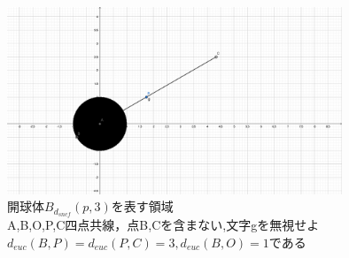 \documentclass{jreport}
\newcommand{\de}{d_{euc}}
\newcommand{\ds}{d_{sncf}}
\newcommand{\bs}{B_{\ds}}
\begin{document}
\begin{figure}[H]
\centering
\includegraphics[width=10cm]{4.pdf}
\caption{開球体$\bs(p,3)$を表す領域\\
	{\footnotesize A,B,O,P,C四点共線，点B,Cを含まない,文字gを無視せよ$\de(B,P)=\de(P,C)=3,\de(B,O)=1$である}}
\end{figure}
\newpage
\end{document}

